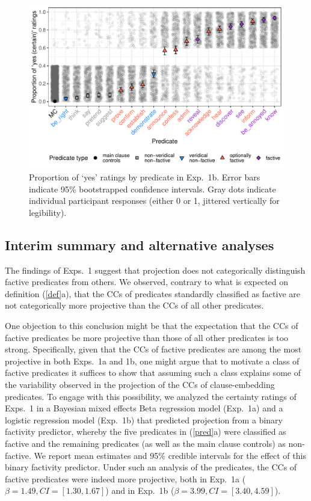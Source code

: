 \documentclass[11pt,fleqn]{article}
\newcommand{\6}{\mbox{$[\hspace*{-.6mm}[$}}
\newcommand{\9}{\mbox{$]\hspace*{-.6mm}]$}}
\begin{document}
\begin{figure}[H]

\centering
\includegraphics[width=.7\paperwidth]{../../results/8-projectivity-no-fact-binary/graphs/proportion-by-predicate-variability}
\caption{Proportion of `yes' ratings by predicate in Exp.~1b. Error bars indicate 95\% bootstrapped confidence intervals. Gray dots indicate individual participant responses (either 0 or 1, jittered vertically for legibility).}
\label{f-projectivity2}

\end{figure}

\subsection{Interim summary and alternative analyses}

The findings of Exps.~1 suggest that projection does not categorically distinguish factive predicates from others. We observed, contrary to what is expected on definition (\ref{def}a), that the CCs of predicates standardly classified as factive are not categorically more projective than the CCs of all other predicates. 

One objection to this conclusion might be that the expectation that the CCs of factive predicates be more projective than those of all other predicates is too strong. Specifically, given that the CCs of factive predicates are among the most projective in both Exps.~1a and 1b, one might argue that to motivate a class of factive predicates it suffices to show that assuming such a class explains some of the variability observed in the projection of the CCs of clause-embedding predicates. To engage with this possibility, we analyzed the certainty ratings of Exps.~1 in a Bayesian mixed effects Beta regression model (Exp.~1a) and a logistic regression model (Exp.~1b) that predicted projection from a binary factivity predictor, whereby the five predicates in (\ref{pred}a) were classified as factive and the remaining predicates (as well as the main clause controls) as non-factive. We report mean estimates and 95\% credible intervals for the effect of this binary factivity predictor. Under such an analysis of the predicates, the CCs of factive predicates were indeed more projective, both in Exp.~1a ($\beta = 1.49, CI = [1.30, 1.67]$) and in Exp.~1b ($\beta = 3.99, CI = [3.40,4.59]$). 
\end{document}
